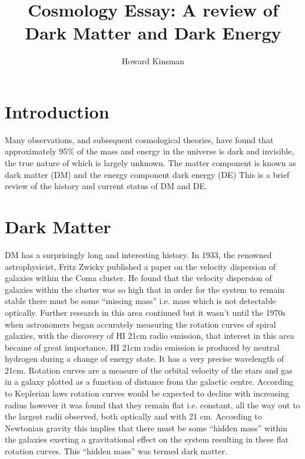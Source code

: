 \documentclass[a4paper,12pt]{article}
\author{Howard Kinsman}
\title{Cosmology Essay: A review of Dark Matter and Dark Energy}
\begin{document}
\maketitle
\section{Introduction}
Many observations, and subsequent cosmological theories, have found that approximately 95\% of the mass and energy in the universe is dark and invisible, the true nature of which is
largely unknown. The matter component is known as dark matter (DM) and the energy component dark energy (DE) This is a brief review of the history and current status of 
DM and DE.
\section{Dark Matter}
DM has a surprisingly long and interesting history. In 1933, the renowned astrophysicist, Fritz Zwicky published a paper on the velocity dispersion of galaxies within the Coma cluster. He found
that the velocity dispersion of galaxies within the cluster was so high that in order for the system to remain stable there must be some ``missing mass'' i.e. mass which
is not detectable optically. Further research in this area continued but it wasn't until the 1970s when astronomers began accurately measuring the rotation curves of spiral galaxies,
with the discovery of HI 21cm radio emission, that interest in this area became of great importance. HI 21cm radio emission is produced by neutral hydrogen during a change of energy
state. It has a very precise wavelength of 21cm.
Rotation curves are a measure of the orbital velocity of the stars and gas in a galaxy plotted as a function of distance from the galactic centre. According to
Keplerian laws rotation curves would be expected to decline with increasing radius however it was found that they remain flat i.e. constant, all the way out to the largest radii observed, 
both optically and with 21 cm. According to Newtonian gravity this implies that there must be some ``hidden mass'' within the galaxies exerting a gravitational effect on the system resulting
in these flat rotation curves. This ``hidden mass'' was termed dark matter.
\end{document}
